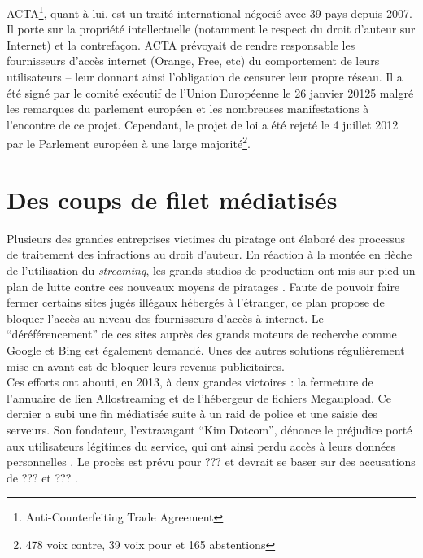 \documentclass[a4paper]{report}
\begin{document}
		ACTA\footnote{Anti-Counterfeiting Trade Agreement}, quant à lui, est un traité international négocié avec 39 pays \cite{no-to-acta} depuis 2007. Il porte sur la propriété intellectuelle (notamment le respect du droit d'auteur sur Internet) et la contrefaçon. ACTA prévoyait de rendre responsable les fournisseurs d'accès internet (Orange, Free, etc) du comportement de leurs utilisateurs – leur donnant ainsi l'obligation de censurer leur propre réseau. Il a été signé par le comité exécutif de l'Union Européenne le 26 janvier 20125 malgré les remarques du parlement européen et les nombreuses manifestations à l'encontre de ce projet. Cependant, le projet de loi a été rejeté le 4 juillet 2012 par le Parlement européen \cite{acta-vote} à une large majorité\footnote{478 voix contre, 39 voix pour et 165 abstentions}.


	\section{Des coups de filet médiatisés}
	Plusieurs des grandes entreprises victimes du piratage ont élaboré des processus de traitement des infractions au droit d'auteur. En réaction à la montée en flèche de l'utilisation du \emph{streaming}, les grands studios de production ont mis sur pied un plan de lutte contre ces nouveaux moyens de piratages \cite{lutte-streaming}. Faute de pouvoir faire fermer certains sites jugés illégaux hébergés à l'étranger, ce plan propose de bloquer l'accès au niveau des fournisseurs d'accès à internet. Le ``déréférencement'' de ces sites auprès des grands moteurs de recherche comme Google et Bing est également demandé. Unes des autres solutions régulièrement mise en avant est de bloquer leurs revenus publicitaires.\\

	Ces efforts ont abouti, en 2013, à deux grandes victoires : la fermeture de l'annuaire de lien Allostreaming \cite{allostreaming} et de l'hébergeur de fichiers Megaupload. Ce dernier a subi une fin médiatisée \cite{megaupload-fermeture} suite à un raid de police et une saisie des serveurs. Son fondateur, l'extravagant ``Kim Dotcom'', dénonce le préjudice porté aux utilisateurs légitimes du service, qui ont ainsi perdu accès à leurs données personnelles \cite{megaupload-prejudice}. Le procès est prévu pour ??? et devrait se baser sur des accusations de ??? et ??? \cite{megaupload-proces}.\\
\end{document}
